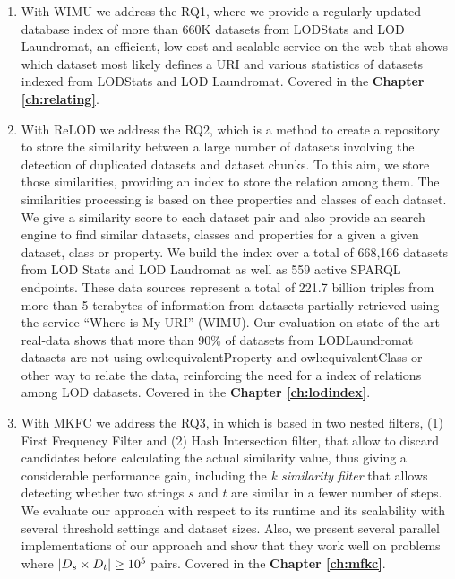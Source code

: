 \begin{enumerate}
    \item With WIMU\cite{valdestilhas2018my} we address the RQ1, where we provide a regularly updated database index of more than 660K datasets from LODStats and LOD Laundromat, an efficient, low cost and scalable service on the web that shows which dataset most likely defines a URI and various statistics of datasets indexed from LODStats and LOD Laundromat. Covered in the \textbf{Chapter \ref{ch:relating}}.
    
    \item With ReLOD\cite{valdestilhas2019ReLOD} we address the RQ2, which is a method to create a repository to store the similarity between a large number of datasets involving the detection of duplicated datasets and dataset chunks. To this aim, we store those similarities, providing an index to store the relation among them. The similarities processing is based on thee properties and classes of each dataset. We give a similarity score to each dataset pair and also provide an search engine to find similar datasets, classes and properties for a given a given dataset, class or property. We build the index over a total of 668,166 datasets from LOD Stats and LOD Laudromat as well as 559 active SPARQL endpoints. These data sources represent a total of 221.7 billion triples from more than 5 terabytes of information from datasets partially retrieved using the service ``Where is My URI'' (WIMU). Our evaluation on state-of-the-art real-data shows that more than 90\% of datasets from LODLaundromat datasets are not using owl:equivalentProperty and owl:equivalentClass or other way to relate the data, reinforcing the need for a index of relations among LOD datasets.  Covered in the \textbf{Chapter \ref{ch:lodindex}}.
    
	\item With MKFC\cite{valdestilhas2017high} we address the RQ3, in which is based in two nested filters, (1) First Frequency Filter and (2) Hash Intersection filter, that allow to discard candidates before calculating the actual similarity value, thus giving a considerable performance gain, including the \emph{k similarity filter} that allows detecting whether two strings $s$ and $t$ are similar in a fewer number of steps. We evaluate our approach with respect to its runtime and its scalability with several threshold settings and dataset sizes. Also, we present several parallel implementations of our approach and show that they work well on problems where $|{D_s}{} \times {\ensuremath{D_t}}{}| \geq 10^5$ pairs. Covered in the \textbf{Chapter \ref{ch:mfkc}}.
	

\end{enumerate}
